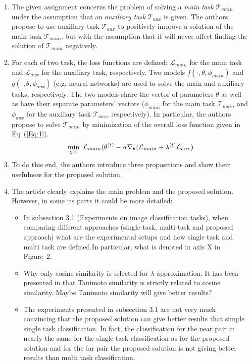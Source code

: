 \documentclass{article} %
\begin{document}
\begin{enumerate}
	\item The given assignment concerns the problem of solving a \textit{main task} $ \mathcal{T}_{main} $ under the assumption that an \textit{auxiliary task} $ \mathcal{T}_{aux} $ is given. The authors propose to use auxiliary task $ \mathcal{T}_{aux} $ to positively improve a solution of the main task $ \mathcal{T}_{main} $, but with the assumption that it will never affect finding the solution of $ \mathcal{T}_{main} $ negatively. 
	\item For each of two task, the loss functions are defined: $ \mathcal{L}_{main} $ for the main task and $ \mathcal{L}_{aux} $ for the auxiliary task, respectively. Two models $ f(\cdot,\theta,\phi_{main}) $ and $g(\cdot,\theta,\phi_{aux})$ (e.g. neural networks) are used to solve the main and auxiliary tasks, respectively. The two models share the vector of parameters $ \theta $ as well as have their separate parameters' vectors ($ \phi_{main} $ for the main task $ \mathcal{T}_{main} $ and $ \phi_{aux} $ for the auxiliary task $ \mathcal{T}_{aux} $, respectively). In particular, the authors propose to solve $ \mathcal{T}_{main} $ by minimization of the overall loss function given in Eq~(\ref{Eq:1}).
	\begin{equation}
		\smash{\displaystyle\min \limits_{\lambda^{(t)}}} \texttt{  } \mathcal{L}_{main}(\theta^{(t)} - \alpha\nabla_{\theta}(\mathcal{L}_{main} + \lambda^{(t)}\mathcal{L}_{aux})
	\label{Eq:1}
	\end{equation}  
	\item To do this end, the authors introduce three propositions and show their usefulness for the proposed solution.
	\item The article clearly explains the main problem and the proposed solution. However, in some its parts it could be more detailed: 
	\begin{itemize}
		\item In subsection 3.1 (Experiments on image classification tasks), when comparing different approaches (single-task, multi-task and proposed approach) what are the experimental setups and how single task and multi task are defined.In particular, what is denoted in axis X in Figure~2.
		\item Why only cosine similarity is selected for $ \lambda $ approximation. It has been presented in \citep{Kryszkiewicz}  that Tanimoto similarity is strictly related to cosine similarity. Maybe Tanimoto similarity will give better results?
		\item The experiments presented in subsection 3.1 are not very much convincing that the proposed solution can give better results that simple single task classification. In fact, the classification for the near pair in nearly the same for the single task classification as for the proposed solution and for the far pair the proposed solution is not giving better results than multi task classification.
	\end{itemize}  
\end{enumerate}
\end{document}
